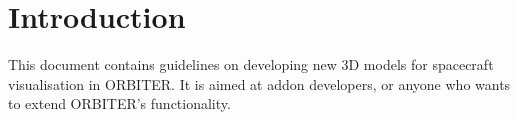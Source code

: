 \documentclass[Orbiter Developer Manual.tex]{subfiles}
\begin{document}
\section{Introduction}
This document contains guidelines on developing new 3D models for spacecraft visualisation in ORBITER. It is aimed at addon developers, or anyone who wants to extend ORBITER's functionality.
\end{document}
